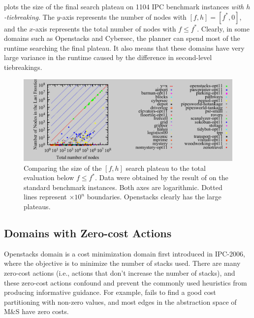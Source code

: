  plots the size of the final search plateau on 1104 IPC
benchmark instances \emph{with $h$-tiebreaking}.
The $y$-axis
represents the number of nodes with $[f,h]=[f^*,0]$, and the $x$-axis represents the total
number of nodes with $f\leq f^*$.
Clearly, in some domains such as Openstacks and Cybersec, the planner can spend most of the runtime
searching the final plateau.
It also
means that these domains have very large variance in the runtime caused
by the difference in second-level tiebreakings. 




\begin{figure}[tb]
 \centering {}
  \includegraphics{tables/aaai16-frontier/aaai16prelim3/lmcut_frontier-front.pdf}
  \caption{Comparing the size of the $[f,h]$ search plateau to the total
  evaluation below $f\leq f^*$. Data were obtained by the result of
  \lmcut on the standard benchmark instances. Both axes are
  logarithmic. Dotted lines represent $\times 10^n$ boundaries.
  Openstacks clearly has the large plateaus.}  \label{plateau}
\end{figure}

\subsection{Domains with Zero-cost Actions}

Openstacks domain is a cost
minimization domain first introduced in IPC-2006, where the objective is to 
minimize the number of stacks used.
There are many zero-cost actions (i.e., actions that don't increase the number of stacks), and
these zero-cost actions confound and prevent the commonly used heuristics from producing
informative guidance.
For example, \lmcut \cite{Helmert2009} fails to find a good cost
partitioning with non-zero values, 
and most edges in the abstraction
space of M\&S \cite{helmert2007flexible} have zero costs.

